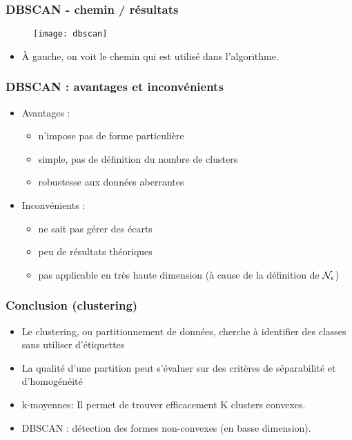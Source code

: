 \begin{frame}
\frametitle{DBSCAN - chemin / résultats}
\begin{figure}[htb]
  \centering
  \texttt{[image: dbscan]}
\end{figure}
\begin{itemize}
	\item À gauche, on voit le chemin qui est utilisé dans l'algorithme. 
\end{itemize}
\end{frame}

\begin{frame}
\frametitle{DBSCAN : avantages et inconvénients}
  \begin{itemize}
  	\item Avantages : 
  	\begin{itemize}
  		\item n'impose pas de forme particulière
  		\item simple, pas de définition du nombre de clusters
  		\item robustesse aux données aberrantes
  	\end{itemize}
  	\item Inconvénients : 
  	\begin{itemize}
  		\item ne sait pas gérer des écarts
  		\item peu de résultats théoriques
  		\item pas applicable en très haute dimension (à cause de la définition de $\mathcal{N}_{\epsilon}$)
  	\end{itemize}
  \end{itemize}
\end{frame}


\begin{frame}
\frametitle{Conclusion (clustering)}
\begin{itemize}
	\item Le clustering, ou partitionnement de données, cherche à identifier des classes sans utiliser d’étiquettes
	\item La qualité d’une partition peut s’évaluer sur des critères de séparabilité et d’homogénéité
	\item k-moyennes: Il permet de trouver efficacement K clusters convexes.
	\item DBSCAN : détection des formes non-convexes (en basse dimension). 
\end{itemize}
\end{frame}

